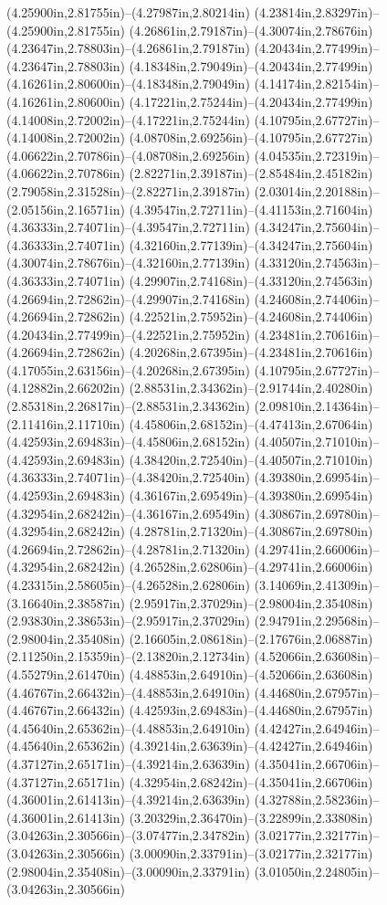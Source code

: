 (4.25900in,2.81755in)--(4.27987in,2.80214in) (4.23814in,2.83297in)--(4.25900in,2.81755in) (4.26861in,2.79187in)--(4.30074in,2.78676in) (4.23647in,2.78803in)--(4.26861in,2.79187in) (4.20434in,2.77499in)--(4.23647in,2.78803in) (4.18348in,2.79049in)--(4.20434in,2.77499in) (4.16261in,2.80600in)--(4.18348in,2.79049in) (4.14174in,2.82154in)--(4.16261in,2.80600in) (4.17221in,2.75244in)--(4.20434in,2.77499in) (4.14008in,2.72002in)--(4.17221in,2.75244in) (4.10795in,2.67727in)--(4.14008in,2.72002in) (4.08708in,2.69256in)--(4.10795in,2.67727in) (4.06622in,2.70786in)--(4.08708in,2.69256in) (4.04535in,2.72319in)--(4.06622in,2.70786in) (2.82271in,2.39187in)--(2.85484in,2.45182in) (2.79058in,2.31528in)--(2.82271in,2.39187in) (2.03014in,2.20188in)--(2.05156in,2.16571in) (4.39547in,2.72711in)--(4.41153in,2.71604in) (4.36333in,2.74071in)--(4.39547in,2.72711in) (4.34247in,2.75604in)--(4.36333in,2.74071in) (4.32160in,2.77139in)--(4.34247in,2.75604in) (4.30074in,2.78676in)--(4.32160in,2.77139in) (4.33120in,2.74563in)--(4.36333in,2.74071in) (4.29907in,2.74168in)--(4.33120in,2.74563in) (4.26694in,2.72862in)--(4.29907in,2.74168in) (4.24608in,2.74406in)--(4.26694in,2.72862in) (4.22521in,2.75952in)--(4.24608in,2.74406in) (4.20434in,2.77499in)--(4.22521in,2.75952in) (4.23481in,2.70616in)--(4.26694in,2.72862in) (4.20268in,2.67395in)--(4.23481in,2.70616in) (4.17055in,2.63156in)--(4.20268in,2.67395in) (4.10795in,2.67727in)--(4.12882in,2.66202in) (2.88531in,2.34362in)--(2.91744in,2.40280in) (2.85318in,2.26817in)--(2.88531in,2.34362in) (2.09810in,2.14364in)--(2.11416in,2.11710in) (4.45806in,2.68152in)--(4.47413in,2.67064in) (4.42593in,2.69483in)--(4.45806in,2.68152in) (4.40507in,2.71010in)--(4.42593in,2.69483in) (4.38420in,2.72540in)--(4.40507in,2.71010in) (4.36333in,2.74071in)--(4.38420in,2.72540in) (4.39380in,2.69954in)--(4.42593in,2.69483in) (4.36167in,2.69549in)--(4.39380in,2.69954in) (4.32954in,2.68242in)--(4.36167in,2.69549in) (4.30867in,2.69780in)--(4.32954in,2.68242in) (4.28781in,2.71320in)--(4.30867in,2.69780in) (4.26694in,2.72862in)--(4.28781in,2.71320in) (4.29741in,2.66006in)--(4.32954in,2.68242in) (4.26528in,2.62806in)--(4.29741in,2.66006in) (4.23315in,2.58605in)--(4.26528in,2.62806in) (3.14069in,2.41309in)--(3.16640in,2.38587in) (2.95917in,2.37029in)--(2.98004in,2.35408in) (2.93830in,2.38653in)--(2.95917in,2.37029in) (2.94791in,2.29568in)--(2.98004in,2.35408in) (2.16605in,2.08618in)--(2.17676in,2.06887in) (2.11250in,2.15359in)--(2.13820in,2.12734in) (4.52066in,2.63608in)--(4.55279in,2.61470in) (4.48853in,2.64910in)--(4.52066in,2.63608in) (4.46767in,2.66432in)--(4.48853in,2.64910in) (4.44680in,2.67957in)--(4.46767in,2.66432in) (4.42593in,2.69483in)--(4.44680in,2.67957in) (4.45640in,2.65362in)--(4.48853in,2.64910in) (4.42427in,2.64946in)--(4.45640in,2.65362in) (4.39214in,2.63639in)--(4.42427in,2.64946in) (4.37127in,2.65171in)--(4.39214in,2.63639in) (4.35041in,2.66706in)--(4.37127in,2.65171in) (4.32954in,2.68242in)--(4.35041in,2.66706in) (4.36001in,2.61413in)--(4.39214in,2.63639in) (4.32788in,2.58236in)--(4.36001in,2.61413in) (3.20329in,2.36470in)--(3.22899in,2.33808in) (3.04263in,2.30566in)--(3.07477in,2.34782in) (3.02177in,2.32177in)--(3.04263in,2.30566in) (3.00090in,2.33791in)--(3.02177in,2.32177in) (2.98004in,2.35408in)--(3.00090in,2.33791in) (3.01050in,2.24805in)--(3.04263in,2.30566in) 